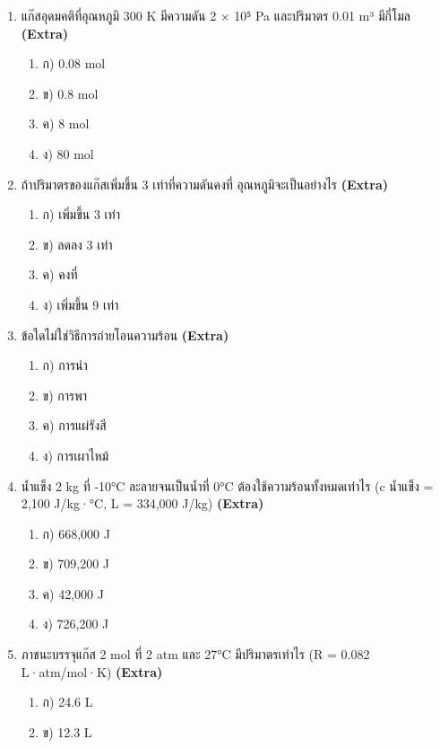 \documentclass[12pt]{article}
\begin{document}
\begin{enumerate}[label=\arabic*.]
\begin{enumerate}[label=)]
\item ข) Q = kAΔT t/d
\item ค) Q = kΔT/(Adt)
\item ง) Q = kdΔT/(At)
\end{enumerate}
\item แก๊สอุดมคติที่อุณหภูมิ 300 K มีความดัน 2 × 10⁵ Pa และปริมาตร 0.01 m³ มีกี่โมล \hfill \textbf{\small (Extra)}
\begin{enumerate}[label=)]
\item ก) 0.08 mol
\item ข) 0.8 mol
\item ค) 8 mol
\item ง) 80 mol
\end{enumerate}
\item ถ้าปริมาตรของแก๊สเพิ่มขึ้น 3 เท่าที่ความดันคงที่ อุณหภูมิจะเป็นอย่างไร \hfill \textbf{\small (Extra)}
\begin{enumerate}[label=)]
\item ก) เพิ่มขึ้น 3 เท่า
\item ข) ลดลง 3 เท่า
\item ค) คงที่
\item ง) เพิ่มขึ้น 9 เท่า
\end{enumerate}
\item ข้อใดไม่ใช่วิธีการถ่ายโอนความร้อน \hfill \textbf{\small (Extra)}
\begin{enumerate}[label=)]
\item ก) การนำ
\item ข) การพา
\item ค) การแผ่รังสี
\item ง) การเผาไหม้
\end{enumerate}
\item น้ำแข็ง 2 kg ที่ -10°C ละลายจนเป็นน้ำที่ 0°C ต้องใช้ความร้อนทั้งหมดเท่าไร (c น้ำแข็ง = 2,100 J/kg·°C, L = 334,000 J/kg) \hfill \textbf{\small (Extra)}
\begin{enumerate}[label=)]
\item ก) 668,000 J
\item ข) 709,200 J
\item ค) 42,000 J
\item ง) 726,200 J
\end{enumerate}
\item ภาชนะบรรจุแก๊ส 2 mol ที่ 2 atm และ 27°C มีปริมาตรเท่าไร (R = 0.082 L·atm/mol·K) \hfill \textbf{\small (Extra)}
\begin{enumerate}[label=)]
\item ก) 24.6 L
\item ข) 12.3 L

\end{enumerate}
\end{enumerate}
\end{document}
